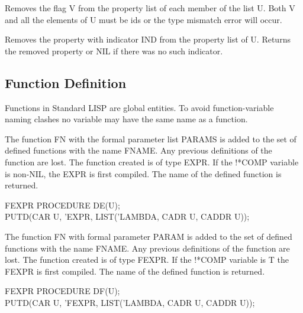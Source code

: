 \documentclass[11pt,letterpaper]{book}
\begin{document}
{Removes the flag V from the property list of each member of the list
U. Both V and all the elements of U must be ids or the type mismatch
error will occur.}


{Removes the property with indicator IND from the property list of U.
Returns the removed property or NIL if there was no such indicator.}



\subsection{Function Definition}
\label{fdef}
Functions in Standard LISP are global entities. To avoid
function-variable naming clashes no variable may have the same name as
a function. 


{The function FN with the formal parameter list PARAMS is added to the
set of defined functions with the name FNAME. Any previous definitions
of the function are lost. The function created is of type
EXPR.  If the !*COMP variable is non-NIL, the EXPR is first
compiled. The name of the defined function is returned.

{\tt \begin{tabbing} FEXPR PROCEDURE DE(U); \\
\hspace*{1em} PUTD(CAR U, 'EXPR, LIST('LAMBDA, CADR U, CADDR U));
\end{tabbing}}}


{The function FN with formal parameter PARAM is added to the set of
defined functions with the name FNAME. Any previous definitions of the
function are lost. The function created is of type FEXPR.
 
If the !*COMP variable is T the FEXPR is first compiled. The name of
the defined function is returned.

{\tt \begin{tabbing} FEXPR PROCEDURE DF(U); \\
\hspace*{1em} PUTD(CAR U, 'FEXPR, LIST('LAMBDA, CADR U, CADDR U)); \\
\end{tabbing} }}
\end{document}
